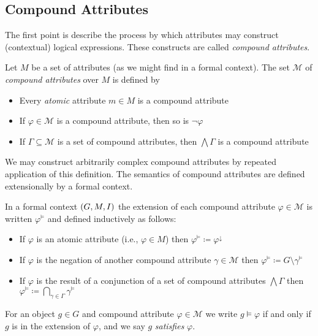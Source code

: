 \subsection{Compound Attributes}
\label{subsection:compound-attributes}

The first point is describe the process by which attributes may construct (contextual) logical expressions. These
constructs are called \textit{compound attributes}.

\begin{definition}
	\label{definition:compound-attributes}

	Let $M$ be a set of attributes (as we might find in a formal context). The set $\mathcal{M}$ of \emph{compound
	attributes} over $M$ is defined by
	\begin{itemize}
		\item Every \textit{atomic} attribute $m \in M$ is a compound attribute

		\item If $\varphi \in \mathcal{M}$ is a compound attribute, then so is $\neg \varphi$

		\item If $\Gamma \subseteq \mathcal{M}$ is a set of compound attributes, then $\bigwedge \Gamma$ is a compound
			attribute
	\end{itemize}
\end{definition}
%
We may construct arbitrarily complex compound attributes by repeated application of this definition. The semantics of
compound attributes are defined extensionally by a formal context.
\begin{definition}
	\label{definition:compound-attributes-semantics}

	In a formal context $(G,M,\mathrel{I})$ the extension of each compound attribute $\varphi \in \mathcal{M}$ is written
	$\varphi^{\vDash}$ and defined inductively as follows:
	\begin{itemize}
		\item If $\varphi$ is an atomic attribute (i.e., $\varphi \in M$) then $\varphi^{\vDash}\coloneq \varphi^{\downarrow}$

		\item If $\varphi$ is the negation of another compound attribute $\gamma \in \mathcal{M}$ then $\varphi^{\vDash}\coloneq
			G \setminus \gamma^{\vDash}$

		\item If $\varphi$ is the result of a conjunction of a set of compound attributes $\bigwedge \Gamma$ then $\varphi^{\vDash}
			\coloneq \underset{\gamma \in \Gamma}\bigcap \gamma^{\vDash}$
	\end{itemize}
	For an object $g\in G$ and compound attribute $\varphi \in \mathcal{M}$ we write $g \vDash \varphi$ if and only if $g$
	is in the extension of $\varphi$, and we say $g$ \emph{satisfies} $\varphi$.
\end{definition}

